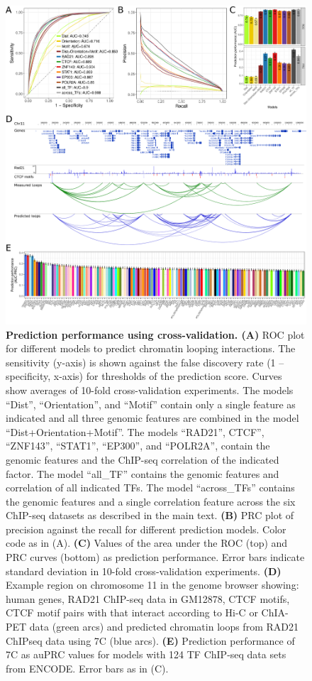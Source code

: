 \documentclass[a4paper,twoside=true,openright,parskip=full,chapterprefix=true,11pt,headings=normal,bibliography=totoc,listof=totoc,titlepage=on,captions=tableabove,draft=false]{scrreprt}
\theoremstyle{definition}
\theoremstyle{definition}
\theoremstyle{definition}
\theoremstyle{remark}
\begin{document}
\begin{figure}

{\centering \includegraphics[width=1\linewidth]{figures/loop_prediction/fig3_v05} 

}

\caption{\textbf{Prediction performance using cross-validation.
(A)} ROC plot for different models to predict chromatin looping
interactions. The sensitivity (y-axis) is shown against the false
discovery rate (1 -- specificity, x-axis) for thresholds of the
prediction score. Curves show averages of 10-fold cross-validation
experiments. The models ``Dist'', ``Orientation'', and ``Motif'' contain
only a single feature as indicated and all three genomic features are
combined in the model ``Dist+Orientation+Motif''. The models ``RAD21'',
CTCF'', ``ZNF143'', ``STAT1'', ``EP300'', and ``POLR2A'', contain the
genomic features and the ChIP-seq correlation of the indicated factor.
The model ``all\_TF'' contains the genomic features and correlation of
all indicated TFs. The model ``across\_TFs'' contains the genomic
features and a single correlation feature across the six ChIP-seq
datasets as described in the main text. \textbf{(B)} PRC plot of
precision against the recall for different prediction models. Color code
as in (A). \textbf{(C)} Values of the area under the ROC (top) and PRC
curves (bottom) as prediction performance. Error bars indicate standard
deviation in 10-fold cross-validation experiments. \textbf{(D)} Example
region on chromosome 11 in the genome browser showing: human genes,
RAD21 ChIP-seq data in GM12878, CTCF motifs, CTCF motif pairs with that
interact according to Hi-C or ChIA-PET data (green arcs) and predicted
chromatin loops from RAD21 ChIPseq data using 7C (blue arcs).
\textbf{(E)} Prediction performance of 7C as auPRC values for models
with 124 TF ChIP-seq data sets from ENCODE. Error bars as in (C).}\label{fig:LoopPred3}
\end{figure}
\end{document}
